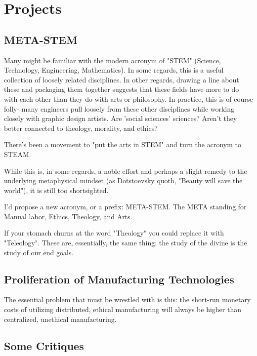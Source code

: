 \documentclass[10pt,letterpaper,openany]{book}
\begin{document}
\chapter{Projects}

\section{META-STEM}

Many might be familiar with the modern acronym of "STEM" (Science, Technology, Engineering, Mathematics). In some regards, this is a useful collection of loosely related disciplines. In other regards, drawing a line about these and packaging them together suggests that these fields have more to do with each other than they do with arts or philosophy. In practice, this is of course folly- many engineers pull loosely from these other disciplines while working closely with graphic design artists. Are 'social sciences' sciences? Aren't they better connected to theology, morality, and ethics?

There's been a movement to "put the arts in STEM" and turn the acronym to STEAM.

While this is, in some regards, a noble effort and perhaps a slight remedy to the underlying metaphysical mindset (as Dotstoevsky quoth, "Beauty will save the world"), it is still too shortsighted.

I'd propose a new acronym, or a prefix: META-STEM. The META standing for Manual labor, Ethics, Theology, and Arts.

If your stomach churns at the word "Theology" you could replace it with "Teleology". These are, essentially, the same thing: the study of the divine is the study of our end goals.

\section{Proliferation of Manufacturing Technologies}

The essential problem that must be wrestled with is this: the short-run monetary costs of utilizing distributed, ethical manufacturing will always be higher than centralized, unethical manufacturing.



\iffalse

\section{Some Critiques}
\end{document}
